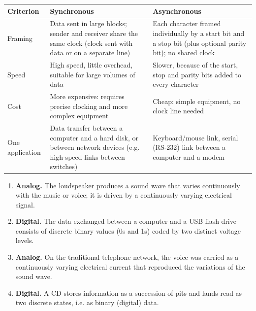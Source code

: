 \documentclass[11pt]{article}
\begin{document}
\begin{corrige}
\begin{center}
\begin{tabularx}{\linewidth}{|l|X|X|}
\hline
\rowcolor{popblueL} \textbf{Criterion} & \textbf{Synchronous} & \textbf{Asynchronous} \\
\hline
Framing & Data sent in large blocks; sender and receiver share the same clock (clock sent with data or on a separate line) & Each character framed individually by a start bit and a stop bit (plus optional parity bit); no shared clock \\
\hline
Speed & High speed, little overhead, suitable for large volumes of data & Slower, because of the start, stop and parity bits added to every character \\
\hline
Cost & More expensive: requires precise clocking and more complex equipment & Cheap: simple equipment, no clock line needed \\
\hline
One application & Data transfer between a computer and a hard disk, or between network devices (e.g. high-speed links between switches) & Keyboard/mouse link, serial (RS-232) link between a computer and a modem \\
\hline
\end{tabularx}
\end{center}
\end{corrige}

\begin{corrige}
\begin{enumerate}
\item \textbf{Analog.} The loudspeaker produces a sound wave that varies continuously with the music or voice; it is driven by a continuously varying electrical signal.
\item \textbf{Digital.} The data exchanged between a computer and a USB flash drive consists of discrete binary values (0s and 1s) coded by two distinct voltage levels.
\item \textbf{Analog.} On the traditional telephone network, the voice was carried as a continuously varying electrical current that reproduced the variations of the sound wave.
\item \textbf{Digital.} A CD stores information as a succession of pits and lands read as two discrete states, i.e. as binary (digital) data.
\end{enumerate}
\end{corrige}
\end{document}

